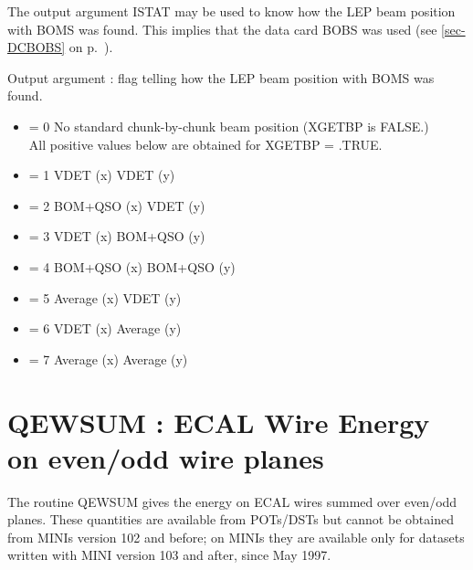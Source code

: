      The output argument ISTAT may be used to know how the LEP beam position with BOMS was found.
     This implies that the data card BOBS was used (see \ref{sec-DCBOBS} on p.~\pageref{sec-DCBOBS}).

\begin{indentlist}{ 3.50cm}{ 3.75cm}
     Output argument :   flag telling how the LEP beam position with BOMS was found.

\begin{itemize}
\item                        = 0    No standard chunk-by-chunk beam position (XGETBP is    FALSE.)\\
                                     All positive values below are obtained for XGETBP = .TRUE.

\item                        = 1    VDET (x)       VDET (y)
\item                        = 2    BOM+QSO (x)   VDET (y)
\item                        = 3    VDET (x)      BOM+QSO (y)
\item                        = 4    BOM+QSO (x)   BOM+QSO (y)
\item                        = 5    Average (x)    VDET (y)
\item                        = 6    VDET (x)       Average  (y)
\item                        = 7    Average (x)   Average  (y)


\end{itemize}
\end{indentlist}




\par
\section{\label{sec-EWSU2}QEWSUM : ECAL Wire Energy on even/odd wire planes}
\par
{}
\par


     The routine QEWSUM 
gives the energy on ECAL wires summed over even/odd
      planes. These quantities are available from POTs/DSTs but cannot be obtained from MINIs 
version 102 and before; on MINIs they are available only for datasets written with MINI version 
       103 and after, since May 1997.
                        


